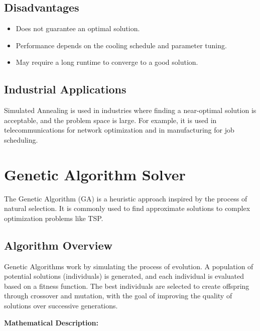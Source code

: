 \documentclass[a4paper,12pt]{report}
\begin{document}
\subsection{Disadvantages}
\begin{itemize}
    \item Does not guarantee an optimal solution.
    \item Performance depends on the cooling schedule and parameter tuning.
    \item May require a long runtime to converge to a good solution.
\end{itemize}

\subsection{Industrial Applications}
Simulated Annealing is used in industries where finding a near-optimal solution is acceptable, and the problem space is large. For example, it is used in telecommunications for network optimization and in manufacturing for job scheduling.

\section{Genetic Algorithm Solver}
The Genetic Algorithm (GA) is a heuristic approach inspired by the process of natural selection. It is commonly used to find approximate solutions to complex optimization problems like TSP.

\subsection{Algorithm Overview}
Genetic Algorithms work by simulating the process of evolution. A population of potential solutions (individuals) is generated, and each individual is evaluated based on a fitness function. The best individuals are selected to create offspring through crossover and mutation, with the goal of improving the quality of solutions over successive generations.

\textbf{Mathematical Description:}
\end{document}
